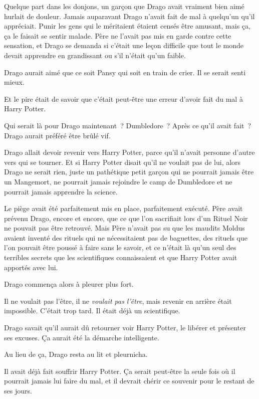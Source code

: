 Quelque part dans les donjons, un garçon que Drago avait vraiment bien aimé hurlait de douleur. Jamais auparavant Drago n'avait fait de mal à quelqu'un qu'il appréciait. Punir les gens qui le méritaient étaient censés être amusant, mais ça, ça le faisait se sentir malade. Père ne l'avait pas mis en garde contre cette sensation, et Drago se demanda si c'était une leçon difficile que tout le monde devait apprendre en grandissant ou s'il n'était qu'un faible.

Drago aurait aimé que ce soit Pansy qui soit en train de crier. Il se serait senti mieux.

Et le pire était de savoir que c'était peut-être une erreur d'avoir fait du mal à Harry Potter.

Qui serait là pour Drago maintenant~? Dumbledore~? Après ce qu'il avait fait~? Drago aurait préféré être brûlé vif.

Drago allait devoir revenir vers Harry Potter, parce qu'il n'avait personne d'autre vers qui se tourner. Et si Harry Potter disait qu'il ne voulait pas de lui, alors Drago ne serait rien, juste un pathétique petit garçon qui ne pourrait jamais être un Mangemort, ne pourrait jamais rejoindre le camp de Dumbledore et ne pourrait jamais apprendre la science.

Le piège avait été parfaitement mis en place, parfaitement exécuté. Père avait prévenu Drago, encore et encore, que ce que l'on sacrifiait lors d'un Rituel Noir ne pouvait pas être retrouvé. Mais Père n'avait pas su que les maudits Moldus avaient inventé des rituels qui ne nécessitaient pas de baguettes, des rituels que l'on pouvait être poussé à faire sans le savoir, et ce n'était là qu'un seul des terribles secrets que les scientifiques connaissaient et que Harry Potter avait apportés avec lui.

Drago commença alors à pleurer plus fort.

Il ne voulait pas l'être, il ne \emph{voulait pas l'être}, mais revenir en arrière était impossible. C'était trop tard. Il était déjà un scientifique.

Drago savait qu'il aurait dû retourner voir Harry Potter, le libérer et présenter ses excuses. Ça aurait été la démarche intelligente.

Au lieu de ça, Drago resta au lit et pleurnicha.

Il avait déjà fait souffrir Harry Potter. Ça serait peut-être la seule fois où il pourrait jamais lui faire du mal, et il devrait chérir ce souvenir pour le restant de ses jours.

